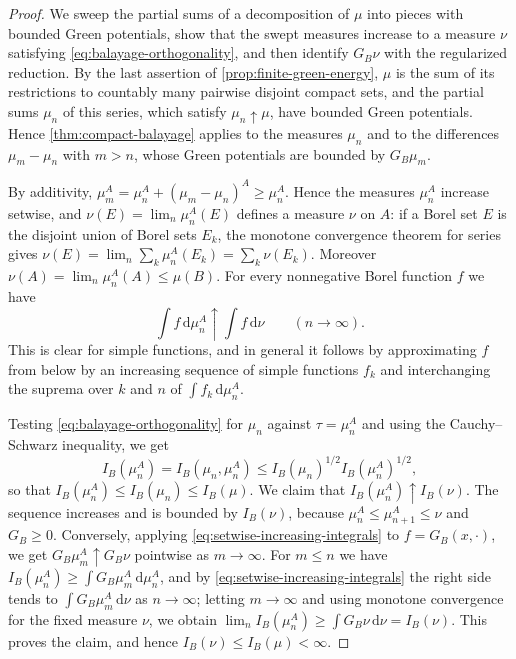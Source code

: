 \begin{proof}
We sweep the partial sums of a decomposition of $\mu$ into pieces with bounded Green potentials, show that the swept measures increase to a measure $\nu$ satisfying \eqref{eq:balayage-orthogonality}, and then identify $G_B\nu$ with the regularized reduction. By the last assertion of \cref{prop:finite-green-energy}, $\mu$ is the sum of its restrictions to countably many pairwise disjoint compact sets, and the partial sums $\mu_n$ of this series, which satisfy $\mu_n\uparrow\mu$, have bounded Green potentials. Hence \cref{thm:compact-balayage} applies to the measures $\mu_n$ and to the differences $\mu_m-\mu_n$ with $m>n$, whose Green potentials are bounded by $G_B\mu_m$.

By additivity, $\mu_m^A=\mu_n^A+(\mu_m-\mu_n)^A\geq\mu_n^A$. Hence the measures $\mu_n^A$ increase setwise, and $\nu(E)=\lim_n\mu_n^A(E)$ defines a measure $\nu$ on $A$: if a Borel set $E$ is the disjoint union of Borel sets $E_k$, the monotone convergence theorem for series gives $\nu(E)=\lim_n\sum_k\mu_n^A(E_k)=\sum_k\nu(E_k)$. Moreover $\nu(A)=\lim_n\mu_n^A(A)\leq\mu(B)$. For every nonnegative Borel function $f$ we have
\begin{equation}\label{eq:setwise-increasing-integrals}
 \int f\,\mathrm d\mu_n^A\uparrow\int f\,\mathrm d\nu\qquad(n\to\infty).
\end{equation}
This is clear for simple functions, and in general it follows by approximating $f$ from below by an increasing sequence of simple functions $f_k$ and interchanging the suprema over $k$ and $n$ of $\int f_k\,\mathrm d\mu_n^A$.

Testing \eqref{eq:balayage-orthogonality} for $\mu_n$ against $\tau=\mu_n^A$ and using the Cauchy--Schwarz inequality, we get
\[
 I_B(\mu_n^A)=I_B(\mu_n,\mu_n^A)\leq I_B(\mu_n)^{1/2}I_B(\mu_n^A)^{1/2},
\]
so that $I_B(\mu_n^A)\leq I_B(\mu_n)\leq I_B(\mu)$. We claim that $I_B(\mu_n^A)\uparrow I_B(\nu)$. The sequence increases and is bounded by $I_B(\nu)$, because $\mu_n^A\leq\mu_{n+1}^A\leq\nu$ and $G_B\geq0$. Conversely, applying \eqref{eq:setwise-increasing-integrals} to $f=G_B(x,\cdot)$, we get $G_B\mu_m^A\uparrow G_B\nu$ pointwise as $m\to\infty$. For $m\leq n$ we have $I_B(\mu_n^A)\geq\int G_B\mu_m^A\,\mathrm d\mu_n^A$, and by \eqref{eq:setwise-increasing-integrals} the right side tends to $\int G_B\mu_m^A\,\mathrm d\nu$ as $n\to\infty$; letting $m\to\infty$ and using monotone convergence for the fixed measure $\nu$, we obtain $\lim_nI_B(\mu_n^A)\geq\int G_B\nu\,\mathrm d\nu=I_B(\nu)$. This proves the claim, and hence $I_B(\nu)\leq I_B(\mu)<\infty$.


\end{proof}
